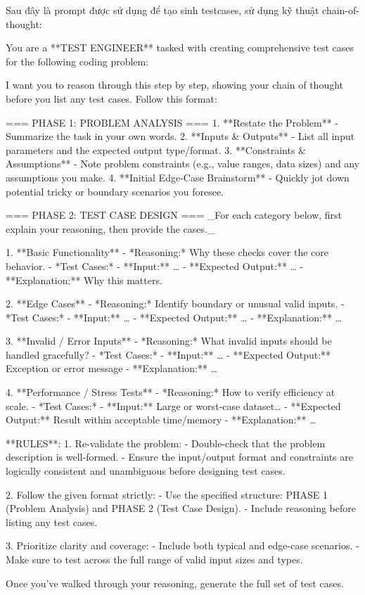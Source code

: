 Sau đây là prompt được sử dụng để tạo sinh testcases, sử dụng kỹ thuật chain-of-thought:
\begin{promptblock}
You are a **TEST ENGINEER** tasked with creating comprehensive test cases for the following coding problem:

{}

I want you to reason through this step by step, showing your chain of thought before you list any test cases. Follow this format:

=== PHASE 1: PROBLEM ANALYSIS ===
1. **Restate the Problem**  
   - Summarize the task in your own words.  
2. **Inputs \& Outputs**  
   - List all input parameters and the expected output type/format.  
3. **Constraints \& Assumptions**  
   - Note problem constraints (e.g., value ranges, data sizes) and any assumptions you make.  
4. **Initial Edge‑Case Brainstorm**  
   - Quickly jot down potential tricky or boundary scenarios you foresee.

=== PHASE 2: TEST CASE DESIGN ===  
\_For each category below, first explain your reasoning, then provide the cases.\_

1. **Basic Functionality**  
   - *Reasoning:* Why these checks cover the core behavior.  
   - *Test Cases:*  
     - **Input:** …  
     - **Expected Output:** …  
     - **Explanation:** Why this matters.

2. **Edge Cases**  
   - *Reasoning:* Identify boundary or unusual valid inputs.  
   - *Test Cases:*  
     - **Input:** …  
     - **Expected Output:** …  
     - **Explanation:** …

3. **Invalid / Error Inputs**  
   - *Reasoning:* What invalid inputs should be handled gracefully?  
   - *Test Cases:*  
     - **Input:** …  
     - **Expected Output:** Exception or error message  
     - **Explanation:** …

4. **Performance / Stress Tests**  
   - *Reasoning:* How to verify efficiency at scale.  
   - *Test Cases:*  
     - **Input:** Large or worst‑case dataset…  
     - **Expected Output:** Result within acceptable time/memory  
     - **Explanation:** …

**RULES**:
1. Re-validate the problem:
   - Double-check that the problem description is well-formed.
   - Ensure the input/output format and constraints are logically consistent and unambiguous before designing test cases.

2. Follow the given format strictly:
   - Use the specified structure: PHASE 1 (Problem Analysis) and PHASE 2 (Test Case Design).
   - Include reasoning before listing any test cases.

3. Prioritize clarity and coverage:
   - Include both typical and edge-case scenarios.
   - Make sure to test across the full range of valid input sizes and types.

Once you’ve walked through your reasoning, generate the full set of test cases.
\end{promptblock}

